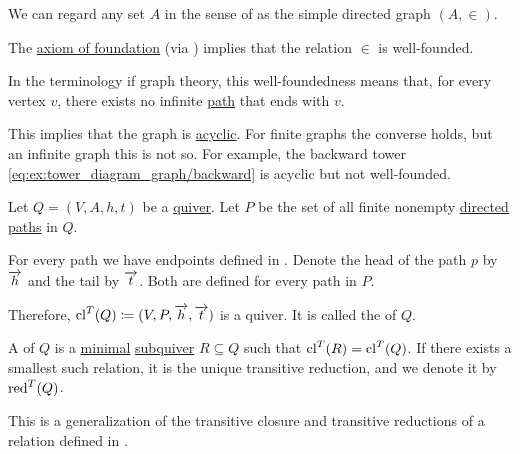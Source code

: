 \begin{remark}\label{rem:well_founded_graphs}
  We can regard any set \( A \) in the sense of \hyperref[def:zfc]{} as the simple directed graph \( (A, \in) \).

  The \hyperref[def:zfc/foundation]{axiom of foundation} (via ) implies that the relation \( \in \) is well-founded.

  In the terminology if graph theory, this well-foundedness means that, for every vertex \( v \), there exists no infinite \hyperref[def:quiver_path]{path} that ends with \( v \).

  This implies that the graph is \hyperref[def:undirected_multigraph_path]{acyclic}. For finite graphs the converse holds, but an infinite graph this is not so. For example, the backward tower \eqref{eq:ex:tower_diagram_graph/backward} is acyclic but not well-founded.
\end{remark}

\begin{definition}\label{def:quiver_transitive_closure}
  Let \( Q = (V, A, h, t) \) be a \hyperref[def:quiver]{quiver}. Let \( P \) be the set of all finite nonempty \hyperref[def:quiver_path/directed]{directed paths} in \( Q \).

  For every path we have endpoints defined in . Denote the head of the path \( p \) by \( \overrightarrow{h} \) and the tail by \( \overrightarrow{t} \). Both are defined for every path in \( P \).

  Therefore, \( \operatorname{cl}^T(Q) \coloneqq (V, P, \overrightarrow{h}, \overrightarrow{t}) \) is a quiver. It is called the  of \( Q \).

  A  of \( Q \) is a \hyperref[def:partially_ordered_set_extremal_points/maximal_and_minimal_element]{minimal} \hyperref[def:hypergraph/submodels]{subquiver} \( R \subseteq Q \) such that \( \operatorname{cl}^T(R) = \operatorname{cl}^T(Q) \). If there exists a smallest such relation, it is the unique transitive reduction, and we denote it by \( \operatorname{red}^T(Q) \).

  This is a generalization of the transitive closure and transitive reductions of a relation defined in .
\end{definition}

